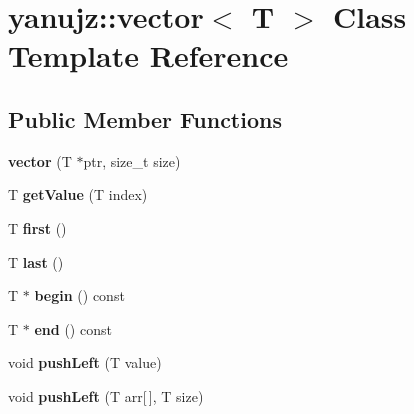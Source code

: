 \hypertarget{classyanujz_1_1vector}{}\section{yanujz\+::vector$<$ T $>$ Class Template Reference}
\label{classyanujz_1_1vector}
\subsection*{Public Member Functions}
\begin{DoxyCompactItemize}
\item 
\mbox{\label{classyanujz_1_1vector_afc2995df62370c8bffab0952d82e69d1}} 
{\bfseries vector} (T $\ast$ptr, size\+\_\+t size)
\item 
\mbox{\label{classyanujz_1_1vector_a4f73ceed1f2fab819718827b77240b31}} 
T {\bfseries get\+Value} (T index)
\item 
\mbox{\label{classyanujz_1_1vector_aaecd4b3fb974c266c26cc1ff56b4f9b7}} 
T {\bfseries first} ()
\item 
\mbox{\label{classyanujz_1_1vector_ab87af80e5f0ab58ae0a980f9a71535bc}} 
T {\bfseries last} ()
\item 
\mbox{\label{classyanujz_1_1vector_a8e03dc943257d9aa5d8575458706d7ab}} 
T $\ast$ {\bfseries begin} () const
\item 
\mbox{\label{classyanujz_1_1vector_ac3ae405b734f1b27dac9262f57858fe6}} 
T $\ast$ {\bfseries end} () const
\item 
\mbox{\label{classyanujz_1_1vector_a8ae16eebf17e251f68741c3bdb6194dc}} 
void {\bfseries push\+Left} (T value)
\item 
\mbox{\label{classyanujz_1_1vector_adeb4def36589813d937b60a66bbcfc12}} 
void {\bfseries push\+Left} (T arr\mbox{[}$\,$\mbox{]}, T size)
\item 
\mbox{\label{classyanujz_1_1vector_af12781ddff0fc729f68278f76822e25e}} 

\end{DoxyCompactItemize}
